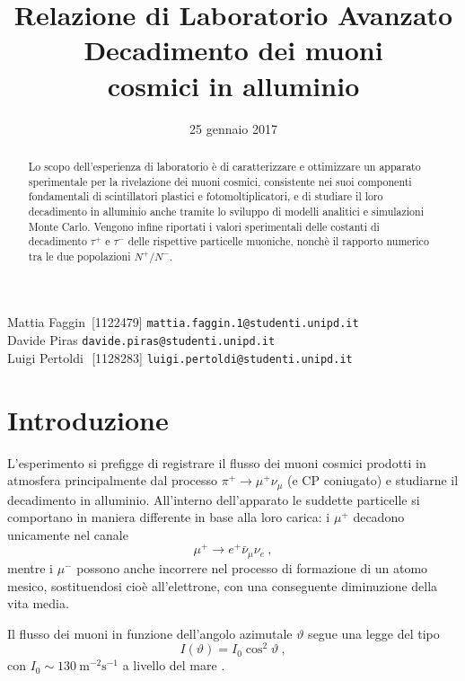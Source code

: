 \documentclass[10pt, oneside, a4paper]{article}   	%
\title{\large{Relazione di Laboratorio Avanzato}\\\Huge{Decadimento dei muoni \\ cosmici in alluminio}}
\date{25 gennaio 2017}
\renewcommand{\theta}{\vartheta}			%
\begin{document}
\maketitle
\thispagestyle{empty}
%
\vspace{4cm}
\begin{abstract}
	Lo scopo dell'esperienza di laboratorio è di caratterizzare e ottimizzare un apparato sperimentale per la rivelazione dei muoni cosmici, consistente nei suoi componenti fondamentali di scintillatori plastici e fotomoltiplicatori, e di studiare il loro decadimento in alluminio anche tramite lo sviluppo di modelli analitici e simulazioni Monte Carlo. Vengono infine riportati i valori sperimentali delle costanti di decadimento $\tau^+$ e $\tau^-$ delle rispettive particelle muoniche, nonchè il rapporto numerico tra le due popolazioni $N^+/N^-$.
\end{abstract}
\vspace*{\fill}
Mattia Faggin \;\,[1122479] \texttt{mattia.faggin.1@studenti.unipd.it} \\
Davide Piras \;\;\;\:[1114287] \texttt{davide.piras@studenti.unipd.it} \\
Luigi Pertoldi \;\,\,[1128283] \texttt{luigi.pertoldi@studenti.unipd.it}
\cleardoublepage
%
\tableofcontents
\clearpage
\listoffigures
\listoftables
%
\clearpage
\section{Introduzione}
L'esperimento si prefigge di registrare il flusso dei muoni cosmici prodotti in atmosfera principalmente dal processo $\pi^+\to\mu^+\nu_\mu$ (e CP coniugato) e studiarne il decadimento in alluminio. All'interno dell'apparato le suddette particelle si comportano in maniera differente in base alla loro carica: i $\mu^+$ decadono unicamente nel canale
\[\mu^+\to e^+\bar{\nu}_\mu\nu_e\ ,\]
mentre i $\mu^-$ possono anche incorrere nel processo di formazione di un atomo mesico, sostituendosi cioè all'elettrone, con una conseguente diminuzione della vita media.

Il flusso dei muoni in funzione dell'angolo azimutale $\theta$ segue una legge del tipo 
\[I(\theta)=I_0\cos^2\theta\ ,\]
con $I_0\sim130\ \text{m}^{-2}\text{s}^{-1}$ a livello del mare \cite{pdg2}.
%
\end{document}

